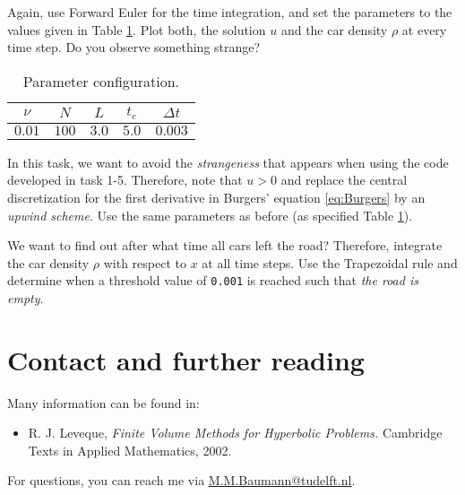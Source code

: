 \documentclass[a4paper,10pt]{article}
\begin{document}
Again, use Forward Euler for the time integration, and set the parameters to the values given in Table \ref{params}. Plot both, the solution $u$ and the car density $\rho$ at every time step. Do you observe something strange?

\begin{table}[ht]
\centering
 \begin{tabular}{|c|c|c|c|c|}
  \hline
  $\nu$ & $N$ & $L$ & $t_e$ & $\Delta t$\\
  \hline
  $0.01$ & $100$ & $3.0$ & $5.0$ & $0.003$\\
  \hline
 \end{tabular}
\caption{Parameter configuration.}\label{params}
\end{table}

In this task, we want to avoid the \textit{strangeness} that appears when using the code developed in task 1-5. Therefore, note that $u>0$ and replace the central discretization for the first derivative in Burgers' equation \eqref{eq:Burgers} by an \textit{upwind scheme}. Use the same parameters as before (as specified Table \ref{params}).

We want to find out after what time all cars left the road? Therefore, integrate the car density $\rho$ with respect to $x$ at all time steps. Use the Trapezoidal rule and determine when a threshold value of \texttt{0.001} is reached such that \textit{the road is empty}.

% 
\section*{Contact and further reading}
Many information can be found in:
\begin{itemize}
 \item R. J. Leveque, \textit{Finite Volume Methods for Hyperbolic Problems.} Cambridge Texts in Applied Mathematics, 2002.
\end{itemize}
For questions, you can reach me via \href{mailto:M.M.Baumann@tudelft.nl}{M.M.Baumann@tudelft.nl}.
\end{document}
